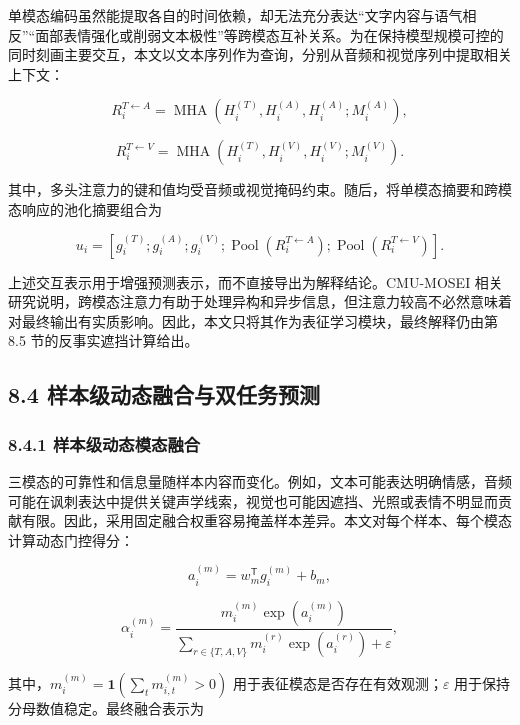 \documentclass[
  12pt,
  a4paper,
]{ctexart}
\begin{document}
单模态编码虽然能提取各自的时间依赖，却无法充分表达``文字内容与语气相反''``面部表情强化或削弱文本极性''等跨模态互补关系。为在保持模型规模可控的同时刻画主要交互，本文以文本序列作为查询，分别从音频和视觉序列中提取相关上下文：

\[
R_i^{T\leftarrow A}=\operatorname{MHA}(H_i^{(T)},H_i^{(A)},H_i^{(A)};M_i^{(A)}),
\]

\[
R_i^{T\leftarrow V}=\operatorname{MHA}(H_i^{(T)},H_i^{(V)},H_i^{(V)};M_i^{(V)}).
\]

其中，多头注意力的键和值均受音频或视觉掩码约束。随后，将单模态摘要和跨模态响应的池化摘要组合为

\[
u_i=[g_i^{(T)};g_i^{(A)};g_i^{(V)};
\operatorname{Pool}(R_i^{T\leftarrow A});
\operatorname{Pool}(R_i^{T\leftarrow V})].
\]

上述交互表示用于增强预测表示，而不直接导出为解释结论。CMU-MOSEI
相关研究说明，跨模态注意力有助于处理异构和异步信息，但注意力较高不必然意味着对最终输出有实质影响。因此，本文只将其作为表征学习模块，最终解释仍由第
8.5 节的反事实遮挡计算给出。

\hypertarget{ux6837ux672cux7ea7ux52a8ux6001ux878dux5408ux4e0eux53ccux4efbux52a1ux9884ux6d4b}{%
\subsection{8.4
样本级动态融合与双任务预测}\label{ux6837ux672cux7ea7ux52a8ux6001ux878dux5408ux4e0eux53ccux4efbux52a1ux9884ux6d4b}}

\hypertarget{ux6837ux672cux7ea7ux52a8ux6001ux6a21ux6001ux878dux5408}{%
\subsubsection{8.4.1
样本级动态模态融合}\label{ux6837ux672cux7ea7ux52a8ux6001ux6a21ux6001ux878dux5408}}

三模态的可靠性和信息量随样本内容而变化。例如，文本可能表达明确情感，音频可能在讽刺表达中提供关键声学线索，视觉也可能因遮挡、光照或表情不明显而贡献有限。因此，采用固定融合权重容易掩盖样本差异。本文对每个样本、每个模态计算动态门控得分：

\[
a_i^{(m)}=w_m^{\mathsf T}g_i^{(m)}+b_m,
\]

\[
\alpha_i^{(m)}=
\frac{m_i^{(m)}\exp(a_i^{(m)})}
{\sum_{r\in\{T,A,V\}}m_i^{(r)}\exp(a_i^{(r)})+\varepsilon},
\]

其中，\(m_i^{(m)}=\mathbf{1}(\sum_t m_{i,t}^{(m)}>0)\)
用于表征模态是否存在有效观测；\(\varepsilon\)
用于保持分母数值稳定。最终融合表示为
\end{document}
